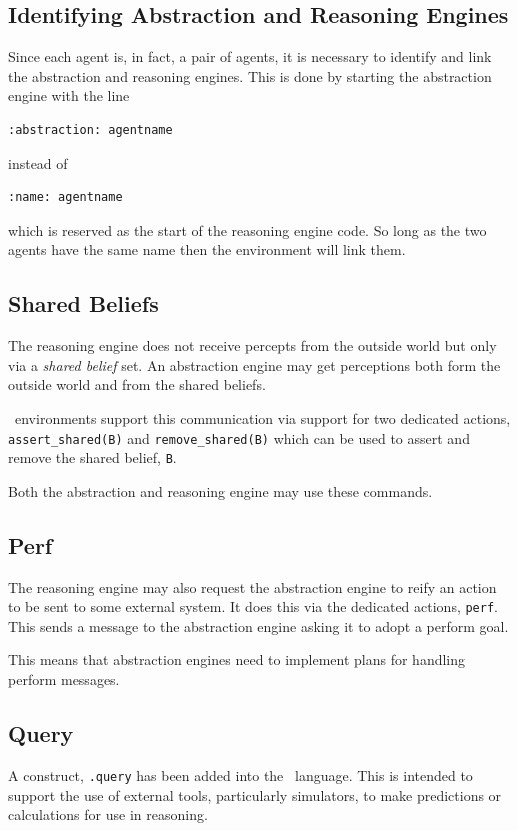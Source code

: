 \documentclass[a4]{article}
\begin{document}
\subsection{Identifying Abstraction and Reasoning Engines}
Since each agent is, in fact, a pair of agents, it is necessary to identify and link the abstraction and reasoning engines.  This is done by starting the abstraction engine with the line
\begin{verbatim}
:abstraction: agentname
\end{verbatim} 
instead of 
\begin{verbatim}
:name: agentname
\end{verbatim} 
which is reserved as the start of the reasoning engine code.  So long as the two agents have the same name then the environment will link them.

\subsection{Shared Beliefs}
The reasoning engine does not receive percepts from the outside world but only via a \emph{shared belief} set.  An abstraction engine may get perceptions both form the outside world and from the shared beliefs.

\eass\ environments support this communication via support for two dedicated actions, \lstinline{assert_shared(B)} and \lstinline{remove_shared(B)} which can be used to assert and remove the shared belief, \lstinline{B}.

Both the abstraction and reasoning engine may use these commands.

\subsection{Perf}
The reasoning engine may also request the abstraction engine to reify an action to be sent to some external system.  It does this via the dedicated actions, \texttt{perf}.  This sends a message to the abstraction engine asking it to adopt a perform goal.

This means that abstraction engines need to implement plans for handling perform messages.

\subsection{Query}
A construct, \texttt{.query} has been added into the \eass\ language.  This is intended to support the use of external tools, particularly simulators, to make predictions or calculations for use in reasoning.  
\end{document}
